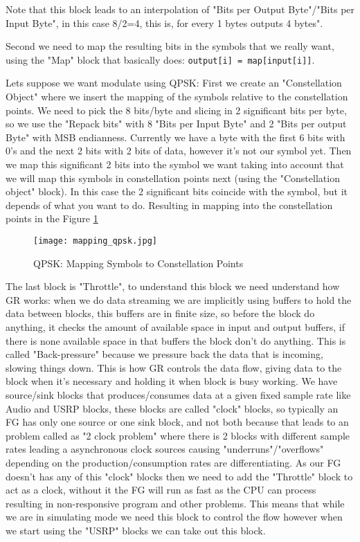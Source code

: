 \documentclass[a4paper, 10pt, conference]{ieeeconf}      %
\begin{document}
    Note that this block leads to an interpolation of "Bits per Output Byte"/"Bits per Input Byte", in this case 8/2=4, this is, for every 1 bytes outputs 4 bytes". 
        
        Second we need to map the resulting bits in the symbols that we really want, using the "Map" block that basically does: \verb|output[i] = map[input[i]]|.
    
    Lets suppose we want modulate using QPSK: 
        First we create an "Constellation Object" where we insert the mapping of the symbols relative to the constellation points. 
        We need to pick the 8 bits/byte and slicing in 2 significant bits per byte, so we use the "Repack bits" with 8 "Bits per Input Byte" and 2 "Bits per output Byte" with MSB endianness. Currently we have a byte with the first 6 bits with 0's and the next 2 bits with 2 bits of data, however it's not our symbol yet.
        Then we map this significant 2 bits into the symbol we want taking into account that we will map this symbols in constellation points next (using the "Constellation object" block). In this case the 2 significant bits coincide with the symbol, but it depends of what you want to do.
        Resulting in mapping into the constellation points in the Figure   \ref{fig:mapping_qpsk}
        \begin{figure}
            \centering
            \texttt{[image: mapping\_qpsk.jpg]}
            \caption{QPSK: Mapping Symbols to Constellation Points}
            \label{fig:mapping_qpsk}
        \end{figure}
        
        The last block is "Throttle", to understand this block we need understand how GR works: when we do data streaming we are implicitly using buffers to hold the data between blocks, this buffers are in finite size, so before the block do anything, it checks the amount of available space in input and output buffers, if there is none available space in that buffers the block don't do anything. This is called "Back-pressure" because we pressure back the data that is incoming, slowing things down. This is how GR controls the data flow, giving data to the block when it's necessary and holding it when block is busy working. We have source/sink blocks that produces/consumes data at a given fixed sample rate like Audio and USRP blocks, these blocks are called "clock" blocks, so typically an FG has only one source or one sink block, and not both because that leads to an problem called as "2 clock problem" where there is 2 blocks with different sample rates leading a asynchronous clock sources causing "underruns"/"overflows" depending on the production/consumption rates are differentiating. As our FG doesn't has any of this "clock" blocks then we need to add the "Throttle" block to act as a clock, without it the FG will run as fast as the CPU can process resulting in non-responsive program and other problems. This means that while we are in simulating mode we need this block to control the flow however when we start using the "USRP" blocks we can take out this block.
        
\end{document}

